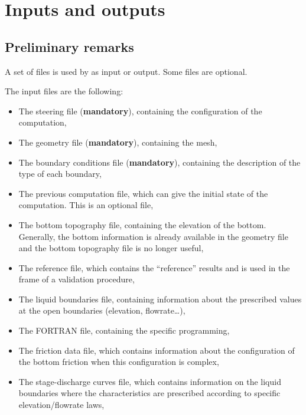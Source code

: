 \chapter{Inputs and outputs}
\label{ch:inp:outp}

\section{Preliminary remarks}

A set of files is used by  as input or output.
Some files are optional.

The input files are the following:

\begin{itemize}
\item The steering file (\textbf{mandatory}), containing the configuration
of the computation,

\item The geometry file (\textbf{mandatory}), containing the mesh,

\item The boundary conditions file (\textbf{mandatory}), containing the
description of the type of each boundary,

\item The previous computation file, which can give the initial state of the
computation.
This is an optional file,

\item The bottom topography file, containing the elevation of the bottom.
Generally, the bottom information is already available in the geometry file
and the bottom topography file is no longer useful,

\item The reference file, which contains the ``reference'' results
and is used in the frame of a validation procedure,

\item The liquid boundaries file, containing information about the prescribed
values at the open boundaries (elevation, flowrate\dots),

\item The FORTRAN file, containing the specific programming,

\item The friction data file, which contains information about the
configuration of the bottom friction when this configuration is complex,

\item The stage-discharge curves file, which contains information on the liquid
boundaries where the characteristics are prescribed according to specific
elevation/flowrate laws,


\end{itemize}
